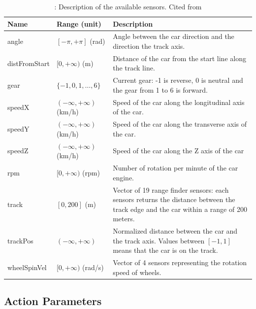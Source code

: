 \documentclass[declaration,shortabstract,english,inz]{iithesis}
\begin{document}
\begin{table}[h]
    \centering
    \begin{tabular}{ |p{2.5cm}|p{2.8cm}|p{8cm}|}
     \hline
     \textbf{Name} & \textbf{Range (unit)} & \textbf{Description} \\ 
     \hline
     angle & $[-\pi, +\pi]$ (rad) & Angle between the car direction and the direction the track axis. \\  
     \hline
     distFromStart & $[0, +\infty)$ (m) & Distance of the car from the start line along the track line. \\
     \hline
     gear & $ \{ -1,0,1, \dots, 6 \} $ & Current gear: -1 is reverse, 0 is neutral and the gear from 1 to 6 is forward. \\
     \hline
     speedX & $ ( -\infty, +\infty ) $ (km/h) & Speed of the car along the longitudinal axis of the car. \\
     \hline
     speedY & $ ( -\infty, +\infty ) $ (km/h) & Speed of the car along the transverse axis of the car. \\
     \hline
     speedZ & $ ( -\infty, +\infty ) $ (km/h) & Speed of the car along the Z axis of the car \\
     \hline
     rpm & $ [0, +\infty ) $ (rpm) & Number of rotation per minute of the car engine. \\
     \hline        
     track &  $[0, 200]$ (m) & Vector of 19 range finder sensors: each sensors returns the distance between the track edge and the car within a range of 200 meters. \\
     \hline
     trackPos & $( -\infty, +\infty )$ & Normalized distance between the car and the track axis. Values between $[-1, 1]$ means that the car is on the track. \\
     \hline
     wheelSpinVel & $[0, +\infty)$ (rad/s) & Vector of 4 sensors representing the rotation speed of wheels. \\
     \hline
    \end{tabular}
     \caption{\label{tab:torcs_sensors}: Description of the available sensors. Cited from \cite{scrc_manual}}
\end{table}

\subsection{Action Parameters}
\end{document}
